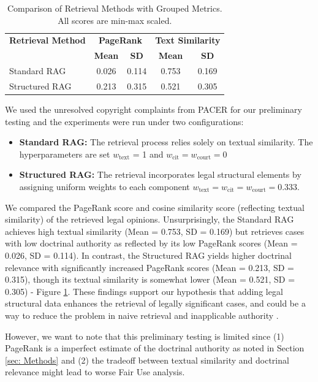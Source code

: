 \begin{table}[ht]
  \centering
  \caption{Comparison of Retrieval Methods with Grouped Metrics. All scores are min-max scaled.}
  \label{tab:grouped_retrieval_comparison}
  \begin{tabular}{l cc | cc}
  \toprule
  \textbf{Retrieval Method} & \multicolumn{2}{c}{\textbf{PageRank}} & \multicolumn{2}{c}{\textbf{Text Similarity}} \\
  \cmidrule(r){2-3} \cmidrule(l){4-5}
                            & \textbf{Mean}    & \textbf{SD}    & \textbf{Mean}      & \textbf{SD}      \\
  \midrule
  Standard RAG    & 0.026 & 0.114 & 0.753 & 0.169 \\
  Structured RAG  & 0.213 & 0.315 & 0.521 & 0.305 \\
  \bottomrule
  \end{tabular}
  \end{table}
  

We used the unresolved copyright complaints from PACER for our preliminary testing and the experiments were run under two configurations:

\begin{itemize}
  \item \textbf{Standard RAG:} The retrieval process relies solely on textual similarity. The hyperparameters are set \(w_{\text{text}}\) = 1 and \(w_{\text{cit}} = w_{\text{court}}= 0\)
  \item \textbf{Structured RAG:} The retrieval incorporates legal structural elements by assigning uniform weights to each component \(w_{\text{text}} = w_{\text{cit}} = w_{\text{court}} = 0.333\).
\end{itemize}
  
We compared the PageRank score and cosine similarity score (reflecting textual similarity) of the retrieved legal opinions. Unsurprisingly, the Standard RAG achieves high textual similarity (Mean = 0.753, SD = 0.169) but retrieves cases with low doctrinal authority as reflected by its low PageRank scores (Mean = 0.026, SD = 0.114). In contrast, the Structured RAG yields higher doctrinal relevance with significantly increased PageRank scores (Mean = 0.213, SD = 0.315), though its textual similarity is somewhat lower (Mean = 0.521, SD = 0.305) - Figure \ref{tab:grouped_retrieval_comparison}. These findings support our hypothesis that adding legal structural data enhances the retrieval of legally significant cases, and could be a way to reduce the problem in naive retrieval and inapplicable authority \cite{04b_HallucinationFree}.

However, we want to note that this preliminary testing is limited since (1) PageRank is a imperfect estimate of the doctrinal authority as noted in Section \ref{sec: Methods} and (2) the tradeoff between textual similarity and doctrinal relevance might lead to worse Fair Use analysis.
